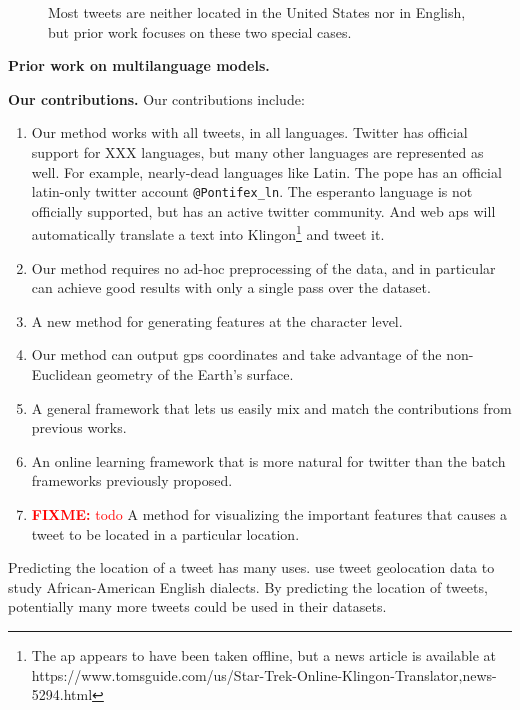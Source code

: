 \documentclass[sigconf,10pt]{acmart}
\newcommand{\str}[1]{\texttt{#1}}
\newcommand{\fixme}[1]{\textcolor{red}{\textbf{FIXME:} {#1}}}
\begin{document}
\begin{figure}
    \resizebox{0.225\textwidth}{!}{}
    \resizebox{0.225\textwidth}{!}{}
    \caption{Most tweets are neither located in the United States nor in English,
    but prior work focuses on these two special cases.}
    \label{fig:country/lang}
\end{figure}

\noindent
\textbf{Prior work on multilanguage models.}

\noindent
\textbf{Our contributions.}
Our contributions include:
\begin{enumerate}
    \item
        Our method works with all tweets, in all languages.
        Twitter has official support for XXX languages,
        but many other languages are represented as well.
        For example, nearly-dead languages like Latin.
        The pope has an official latin-only twitter account \str{@Pontifex\_ln}.
        The esperanto language is not officially supported, but has an active twitter community.
        And web aps will automatically translate a text into Klingon\footnote{The ap appears to have been taken offline, but a news article is available at https://www.tomsguide.com/us/Star-Trek-Online-Klingon-Translator,news-5294.html} and tweet it.
    \item
        Our method requires no ad-hoc preprocessing of the data,
        and in particular can achieve good results with only a single pass over the dataset.
    \item
        A new method for generating features at the character level.
    \item
        Our method can output gps coordinates and take advantage of the non-Euclidean geometry of the Earth's surface.
    \item
        A general framework that lets us easily mix and match the contributions from previous works.
    \item
        An online learning framework that is more natural for twitter than the batch frameworks previously proposed.
    \item
        \fixme{todo}
        A method for visualizing the important features that causes a tweet to be located in a particular location.
\end{enumerate}

Predicting the location of a tweet has many uses.
\citet{blodgett2016demographic} use tweet geolocation data to study African-American English dialects.
By predicting the location of tweets, potentially many more tweets could be used in their datasets.
\end{document}
